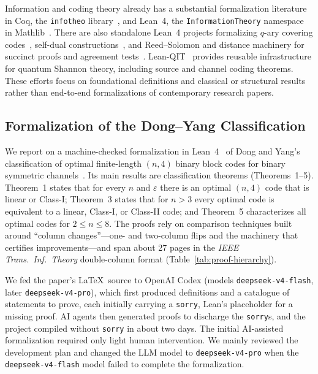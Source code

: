 \documentclass[12pt]{article}
\newcommand{\eps}{\varepsilon}
\begin{document}
Information and coding theory already has a substantial formalization
literature in Coq, the \texttt{infotheo} library~\cite{infotheo}, and 
Lean~4, the \texttt{InformationTheory} namespace in Mathlib~\cite{mathlib}.
There are also standalone Lean~4 projects formalizing $q$-ary covering
codes~\cite{coveringcodes}, self-dual constructions~\cite{selfdual}, and
Reed--Solomon and distance machinery for succinct proofs and agreement
tests~\cite{succinct,splat,zklinalg,sumcheck}. 
Lean-QIT~\cite{leanqit} provides reusable infrastructure for quantum Shannon
theory, including source and channel coding theorems.
These efforts focus on foundational definitions and classical or structural
results rather than end-to-end formalizations of contemporary research papers.

\subsection{Formalization of the Dong--Yang Classification}

We report on a machine-checked formalization in Lean~4~\cite{Lean4} of Dong and Yang's classification of optimal
finite-length $(n,4)$ binary block codes for binary symmetric
channels~\cite{DY25}.
Its main results are classification theorems (Theorems~1--5).
Theorem~1 states that for every $n$ and $\eps$ there is an optimal $(n,4)$
code that is linear or Class-I; Theorem~3 states that for $n>3$ every
optimal code is equivalent to a linear, Class-I, or Class-II code; and
Theorem~5 characterizes all optimal codes for $2\le n\le 8$.
The proofs rely on comparison techniques built around ``column
changes''---one- and two-column flips and the machinery that certifies
improvements---and span about 27 pages in the \emph{IEEE Trans.\ Inf.\ Theory}
double-column format (Table~\ref{tab:proof-hierarchy}).


We fed the paper's \LaTeX\ source to OpenAI Codex (models
\texttt{deepseek-v4-flash}, later \texttt{deepseek-v4-pro}), which first
produced definitions and a catalogue of statements to prove, each initially
carrying a \texttt{sorry}, Lean's placeholder for a missing proof.
AI agents then generated proofs to discharge the \texttt{sorry}s, and the project compiled without \texttt{sorry} in about two days.
The initial AI-assisted formalization required only light human intervention. We mainly reviewed the development plan and changed the LLM model to \texttt{deepseek-v4-pro} when the \texttt{deepseek-v4-flash} model failed to complete the formalization.
\end{document}
